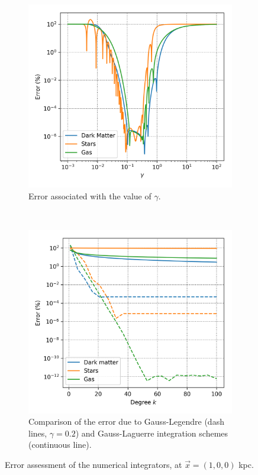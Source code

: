 		\begin{figure}[h]
			\centering
			\begin{subfigure}[t]{0.45\textwidth}
				\includegraphics[width = \textwidth]{"../Files/Week 8/gamma_error"}
				\caption{Error associated with the value of $\gamma$.}
				\label{fig: gammaError}
			\end{subfigure}
			~ 
			\begin{subfigure}[t]{0.45\textwidth}
				\includegraphics[width=\textwidth]{"../Files/Week 8/scheme_error"}
				\caption{Comparison of the error due to Gauss-Legendre (dash lines, $\gamma = 0.2$) and Gauss-Laguerre integration schemes (continuous line).}
				\label{fig: Gscheme_error}
			\end{subfigure}
			\caption{Error assessment of the numerical integrators, at $\vec{x} = (1, 0, 0)$ kpc.}
		\end{figure}
	
